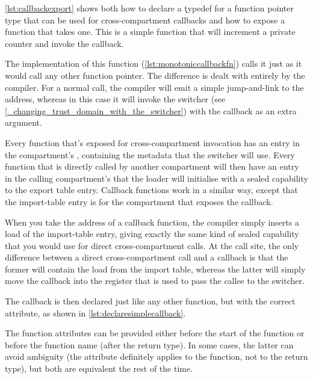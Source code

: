 {{\ref{lst:callbackexport} shows both how to declare a \c{typedef} for a function pointer type that can be used for cross-compartment callbacks and how to expose a function that takes one.
This is a simple function that will increment a private counter and invoke the callback.

\codelisting[filename=examples/compartment_annotation/interface.h,marker=compartment_export_callback,label=lst:callbackexport,caption="Exposing a function that takes a cross-compartment callback for use by other compartments."]{}

The implementation of this function (\ref{lst:monotoniccallbackfn}) calls it just as it would call any other function pointer.
The difference is dealt with entirely by the compiler.
For a normal call, the compiler will emit a simple jump-and-link to the address, whereas in this case it will invoke the switcher (see \ref{_changing_trust_domain_with_the_switcher}) with the callback as an extra argument.

Every function that's exposed for cross-compartment invocation has an entry in the compartment's , containing the metadata that the switcher will use.
Every function that is directly called by another compartment will then have an entry in the calling compartment's  that the loader will initialise with a sealed capability to the export table entry.
Callback functions work in a similar way, except that the import-table entry is for the compartment that exposes the callback.

When you take the address of a callback function, the compiler simply inserts a load of the import-table entry, giving exactly the same kind of sealed capability that you would use for direct cross-compartment calls.
At the call site, the only difference between a direct cross-compartment call and a callback is that the former will contain the load from the import table, whereas the latter will simply move the callback into the register that is used to pass the callee to the switcher.

\codelisting[filename=examples/compartment_annotation/compartment.cc,marker=monotonic,label=lst:monotoniccallbackfn,caption="The body of a function that invokes a cross-compartment callback."]{}

The callback is then declared just like any other function, but with the correct attribute, as shown in \ref{lst:declaresimplecallback}.

\begin{note}
	The function attributes can be provided either before the start of the function or before the function name (after the return type).
	In some cases, the latter can avoid ambiguity (the attribute definitely applies to the function, not to the return type), but both are equivalent the rest of the time.
\end{note}

}}

